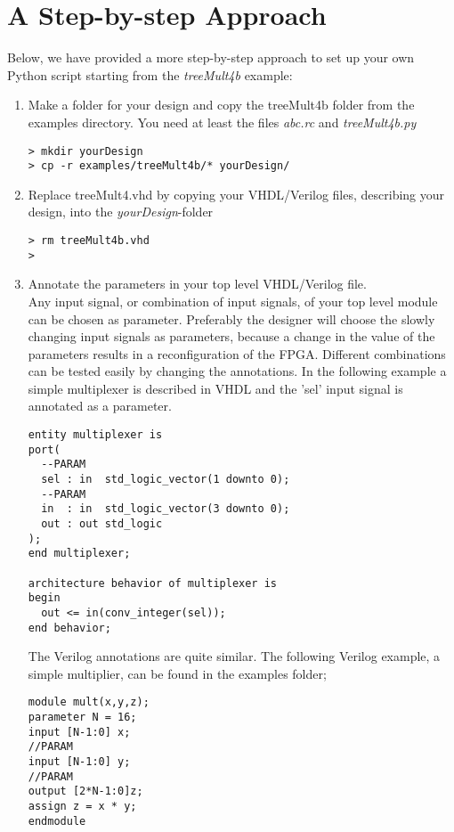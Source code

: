 \documentclass[a4paper,oneside]{memoir}
\begin{document}
\section{A Step-by-step Approach}\label{sec:step_by_step}
Below, we have provided a more step-by-step approach to set up your own Python script starting from the \emph{treeMult4b} example:
\begin{enumerate}
\item Make a folder for your design and copy the treeMult4b folder from the examples directory. You need at least the files \emph{abc.rc} and \emph{treeMult4b.py}\\
\begin{lstlisting}
> mkdir yourDesign
> cp -r examples/treeMult4b/* yourDesign/
\end{lstlisting}
\item Replace treeMult4.vhd by copying your VHDL/Verilog files, describing your design, into the \emph{yourDesign}-folder\\
\begin{lstlisting}
> rm treeMult4b.vhd
> 
\end{lstlisting}
\item Annotate the parameters in your top level VHDL/Verilog file.\\

Any input signal, or combination of input signals, of your top level module can be chosen as parameter. Preferably the designer will choose the slowly changing input signals as parameters, because a change in the value of the parameters results in a reconfiguration of the FPGA. Different combinations can be tested easily by changing the annotations. In the following example a simple multiplexer is described in VHDL and the 'sel' input signal is annotated as a parameter.
\lstset{language=VHDL}
\begin{lstlisting}
entity multiplexer is
port(
  --PARAM
  sel : in  std_logic_vector(1 downto 0);
  --PARAM
  in  : in  std_logic_vector(3 downto 0);
  out : out std_logic
);
end multiplexer;

architecture behavior of multiplexer is
begin
  out <= in(conv_integer(sel));
end behavior;
\end{lstlisting}
The Verilog annotations are quite similar. The following Verilog example, a simple multiplier, can be found in the examples folder;
\lstset{language=Verilog}
\begin{lstlisting}
module mult(x,y,z);
parameter N = 16;
input [N-1:0] x;
//PARAM
input [N-1:0] y;
//PARAM
output [2*N-1:0]z;
assign z = x * y;
endmodule
\end{lstlisting}
 

\end{enumerate}
\end{document}
